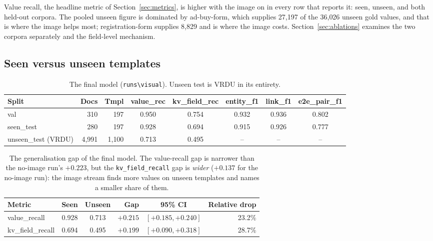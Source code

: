 \documentclass[11pt,a4paper]{article}
\newcommand{\code}[1]{\texttt{\small #1}}
\begin{document}
Value recall, the headline metric of Section~\ref{sec:metrics}, is higher with the image on in
every row that reports it: seen, unseen, and both held-out corpora. The pooled unseen figure is
dominated by ad-buy-form, which supplies 27{,}197 of the 36{,}026 unseen gold values, and that is
where the image helps most; registration-form supplies 8{,}829 and is where the image costs.
Section~\ref{sec:ablations} examines the two corpora separately and the field-level mechanism.

\subsection{Seen versus unseen templates}

\begin{table}[htbp]
\centering\small
\begin{tabular}{@{}lrrccccc@{}}
\toprule
\textbf{Split} & \textbf{Docs} & \textbf{Tmpl} & \textbf{value\_rec} &
\textbf{kv\_field\_rec} & \textbf{entity\_f1} & \textbf{link\_f1} & \textbf{e2e\_pair\_f1} \\
\midrule
val                & 310   & 197   & 0.950 & 0.754 & 0.932 & 0.936 & 0.802 \\
seen\_test         & 280   & 197   & 0.928 & 0.694 & 0.915 & 0.926 & 0.777 \\
unseen\_test (VRDU)& 4{,}991 & 1{,}100 & 0.713 & 0.495 & -- & -- & -- \\
\bottomrule
\end{tabular}
\caption{The final model (\code{runs\textbackslash visual}). Unseen test is VRDU in its entirety.}
\label{tab:main}
\end{table}

\begin{table}[htbp]
\centering\small
\begin{tabular}{@{}lccrcr@{}}
\toprule
\textbf{Metric} & \textbf{Seen} & \textbf{Unseen} & \textbf{Gap} & \textbf{95\% CI} &
\textbf{Relative drop} \\
\midrule
value\_recall    & 0.928 & 0.713 & $+0.215$ & $[+0.185, +0.240]$ & 23.2\% \\
kv\_field\_recall& 0.694 & 0.495 & $+0.199$ & $[+0.090, +0.318]$ & 28.7\% \\
\bottomrule
\end{tabular}
\caption{The generalisation gap of the final model. The value-recall gap is narrower than the
no-image run's $+0.223$, but the \code{kv\_field\_recall} gap is \emph{wider} ($+0.137$ for the
no-image run): the image stream finds more values on unseen templates and names a smaller share
of them.}
\label{tab:gap}
\end{table}
\end{document}
